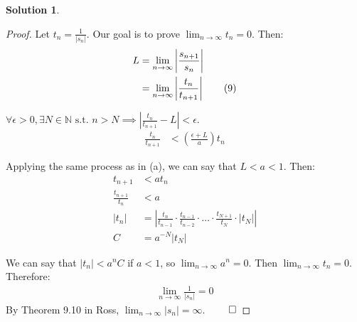 \documentclass[12pt]{article}
\theoremstyle{definition} %
\newtheorem{solution}{Solution}
\theoremstyle{plain} %
\begin{document}
\begin{solution}
\begin{enumerate}
    \begin{proof}
        Let \(t_n = \frac{1}{|s_n|}\). Our goal is to prove \(\lim_{n \to \infty} t_n = 0.\) Then:
        \begin{align}
            L &= \lim_{n \to \infty} \left| \frac{s_{n+1}}{s_n} \right| \notag \\
            &= \lim_{n \to \infty} \left| \frac{t_n}{t_{n+1}} \right| \tag{9}
        \end{align}
    
        \(\forall \epsilon > 0, \exists N \in \mathbb{N} \text{ s.t. } n > N \implies \left| \frac{t_n}{t_{n+1}} - L \right| < \epsilon.\)
        \begin{align}
            \frac{t_n}{t_{n+1}} &< \left( \frac{\epsilon + L}{a} \right) t_n \tag{11}
        \end{align}
    
        Applying the same process as in (a), we can say that \(L < a < 1.\) Then:
        \begin{align}
            t_{n+1} &< at_n \tag{12} \\
            \frac{t_{n+1}}{t_n} &< a \tag{13} \\
            |t_n| &= \left| \frac{t_n}{t_{n-1}} \cdot \frac{t_{n-1}}{t_{n-2}} \cdot \dots \cdot \frac{t_{N+1}}{t_N} \cdot |t_N| \right| \tag{14} \\
            C &= a^{-N} |t_N| \tag{15}
        \end{align}
    
        We can say that \(|t_n| < a^n C\) if \(a < 1\), so \(\lim_{n \to \infty} a^n = 0.\) Then \(\lim_{n \to \infty} t_n = 0.\) Therefore:
        \begin{align}
            \lim_{n \to \infty} \frac{1}{|s_n|} = 0 \tag{16}
        \end{align}
        By Theorem 9.10 in Ross, \(\lim_{n \to \infty} |s_n| = \infty.\) \(\qed\)
    \end{proof}

    \end{enumerate}
    \end{solution}
\end{document}
